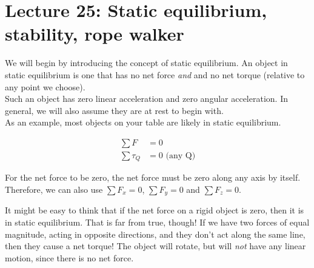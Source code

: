
\section{Lecture 25: Static equilibrium, stability, rope walker}

We will begin by introducing the concept of static equilibrium. An object in static equilibrium is one that has no net force \emph{and} and no net torque (relative to any point we choose).\\
Such an object has zero linear acceleration and zero angular acceleration. In general, we will also assume they are at rest to begin with.\\
As an example, most objects on your table are likely in static equilibrium.

\begin{align}
\sum F &= 0\\
\sum \tau_Q &= 0 \text{ (any Q)}
\end{align}

For the net force to be zero, the net force must be zero along any axis by itself. Therefore, we can also use $\sum F_x = 0$, $\sum F_y = 0$ and $\sum F_z = 0$.

It might be easy to think that if the net force on a rigid object is zero, then it is in static equilibrium. That is far from true, though! If we have two forces of equal magnitude, acting in opposite directions, and they don't act along the same line, then they cause a net torque! The object will rotate, but will \emph{not} have any linear motion, since there is no net force.

\begin{figure}[H]
  \centering
{}
\end{figure}


